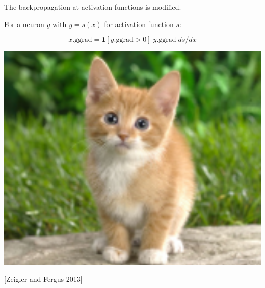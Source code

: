 {\vfill
The backpropagation at activation functions is modified.

\vfill
For a neuron $y$ with $y = s(x)$ for activation function $s$:

$$x.\mathrm{ggrad} = \mathbf{1}[y.\mathrm{ggrad} > 0] \;y.\mathrm{ggrad}\; ds/dx$$



\centerline{\includegraphics[width = 6in]{../images/DeconvKitten}}


\centerline{[Zeigler and Fergus 2013]}

}

